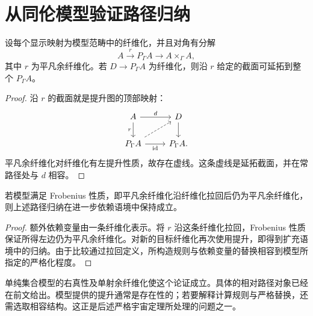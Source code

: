 \section{从同伦模型验证路径归纳}
\begin{proposition}[提升形式的路径归纳]
设每个显示映射为模型范畴中的纤维化，并且对角有分解
\[
A\xrightarrow{r}P_\Gamma A\longrightarrow A\times_\Gamma A,
\]
其中 $r$ 为平凡余纤维化。若 $D\to P_\Gamma A$ 为纤维化，则沿 $r$ 给定的截面可延拓到整个 $P_\Gamma A$。
\end{proposition}
\begin{proof}
沿 $r$ 的截面就是提升图的顶部映射：
\[
\begin{tikzcd}
A\ar[r,"d"]\ar[d,"r"']&D\ar[d]\\
P_\Gamma A\ar[r,"\id"']\ar[ur,dashed]&P_\Gamma A.
\end{tikzcd}
\]
平凡余纤维化对纤维化有左提升性质，故存在虚线。这条虚线是延拓截面，并在常路径处与 $d$ 相容。
\end{proof}
\begin{proposition}[依赖语境扩充]
若模型满足 Frobenius 性质，即平凡余纤维化沿纤维化拉回后仍为平凡余纤维化，则上述路径归纳在进一步依赖语境中保持成立。
\end{proposition}
\begin{proof}
额外依赖变量由一条纤维化表示。将 $r$ 沿这条纤维化拉回，Frobenius 性质保证所得左边仍为平凡余纤维化。对新的目标纤维化再次使用提升，即得到扩充语境中的归纳。由于比较通过拉回定义，所构造规则与依赖变量的替换相容到模型所指定的严格化程度。
\end{proof}
\begin{remark}
单纯集合模型的右真性及单射余纤维化使这个论证成立。具体的相对路径对象已经在前文给出。模型提供的提升通常是存在性的；若要解释计算规则与严格替换，还需选取相容结构。这正是后述严格宇宙定理所处理的问题之一。
\end{remark}


